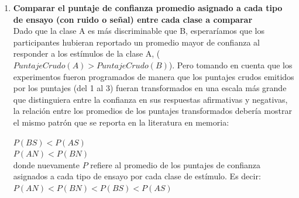 \begin{enumerate}
\item \textbf{Comparar el puntaje de confianza promedio asignado a cada tipo de ensayo (con ruido o señal) entre cada clase a comparar}\\

Dado que la clase A es más discriminable que B, esperaríamos que los participantes hubieran reportado un promedio mayor de confianza al responder a los estímulos de la clase A, ($PuntajeCrudo(A) > PuntajeCrudo(B)$). Pero tomando en cuenta que los experimentos fueron programados de manera que los puntajes crudos emitidos por los puntajes (del 1 al 3) fueran transformados en una escala más grande que distinguiera entre la confianza en sus respuestas afirmativas y negativas, la relación entre los promedios de los puntajes transformados debería mostrar el mismo patrón que se reporta en la literatura en memoria:





\begin{center}
$P(BS) < P(AS)$\\
$P(AN) < P(BN)$\\
donde nuevamente $P$ refiere al promedio de los puntajes de confianza asignados a cada tipo de ensayo por cada clase de estímulo. Es decir:\\
$P(AN) < P(BN) < P(BS) < P(AS)$\\
\end{center}


\end{enumerate}
